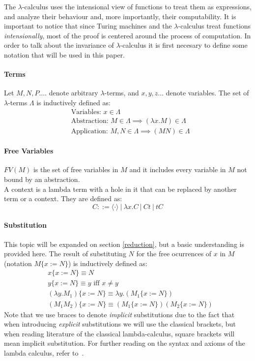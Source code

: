 \documentclass[12pt]{article}
\begin{document}
The $\lambda$-calculus uses the intensional view of functions to treat them as expressions, and analyze their behaviour and, more importantly, their computability. It is important to notice that since Turing machines and the $\lambda$-calculus treat functions \textit{intensionally}, most of the proof is centered around the process of computation.
In order to talk about the invariance of $\lambda$-calculus it is first necesary to define some notation that will be used in this paper.
\paragraph{Terms} Let $M, N, P....$ denote arbitrary $\lambda$-terms, and $x,y,z...$ denote variables. The set of $\lambda$-terms $\Lambda$ is inductively defined as:
\begin{equation}
  \begin{split}
  & \text{Variables: } x \in \Lambda \\
  & \text{Abstraction: } M \in \Lambda \implies ( \lambda x.M ) \in \Lambda \\
  & \text{Application: } M, N \in \Lambda \implies (M N) \in \Lambda
  \end{split}
\end{equation}

\paragraph{Free Variables} $FV(M)$ is the set of free variables in $M$ and it includes every variable in $M$ not bound by an abstraction. \\
A context is a lambda term with a hole in it that can be replaced by another term or a context. They are defined as:
\begin{equation}
C ::= \langle \cdot \rangle \ | \ \lambda x.C \ | \ Ct \ | \ tC
\end{equation}
\paragraph{Substitution} This topic will be expanded on section \ref{reduction}, but a basic understanding is provided here.
The result of substituting $N$ for the free ocurrences of $x$ in $M$ (notation $M \{ x:= N \} $) is inductively defined as:
\begin{equation}
  \begin{split}
    & x\{ x := N \} \equiv N \\
    & y \{ x := N \} \equiv y \text{ iff } x \neq y \\
    & (\lambda y.M_{1}) \{ x:=N \} \equiv \lambda y. ( M_{1} \{ x:=N \} ) \\
    & (M_{1}M_{2}) \{ x:=N \} \equiv (M_{1}\{ x:=N \} )(M_{2} \{ x:=N \} )
  \end{split}
\end{equation}
Note that we use braces to denote \textit{implicit} substitutions due to the fact that when introducing \textit{explicit} substitutions we will use the classical brackets, but when reading literature of the classical lambda-calculus, square brackets will mean implicit substitution.
For further reading on the syntax and axioms of the lambda calculus, refer to~\cite{barendregt1984lambda}.
\end{document}
